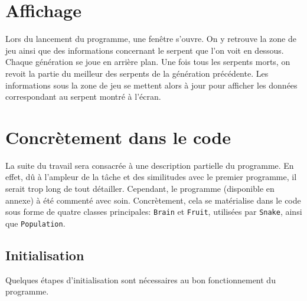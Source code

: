 \documentclass[12pt, a4paper, openany]{book}
\begin{document}
\section{Affichage}
Lors du lancement du programme, une fenêtre s'ouvre. On y retrouve la zone de jeu ainsi que des informations concernant le serpent que l'on voit en dessous. Chaque génération se joue en arrière plan. Une fois tous les serpents morts, on revoit la partie du meilleur des serpents de la génération précédente. Les informations sous la zone de jeu se mettent alors à jour pour afficher les données correspondant au serpent montré à l'écran.

\section{Concrètement dans le code}
La suite du travail sera consacrée à une description partielle du programme. En effet, dû à l'ampleur de la tâche et des similitudes avec le premier programme, il serait trop long de tout détailler. Cependant, le programme (disponible en annexe) à été commenté avec soin. \newline
Concrètement, cela se matérialise dans le code sous forme de quatre classes principales: \verb'Brain' et \verb'Fruit', utilisées par \verb'Snake', ainsi que \verb'Population'.

\subsection{Initialisation}
Quelques étapes d'initialisation sont nécessaires au bon fonctionnement du programme.
\end{document}
